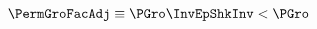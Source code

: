   \begin{align}
    \PermGroFacAdj & \equiv \PGro \InvEpShkInv < \PGro \label{eq:PermGroFacAdj}
  \end{align}
